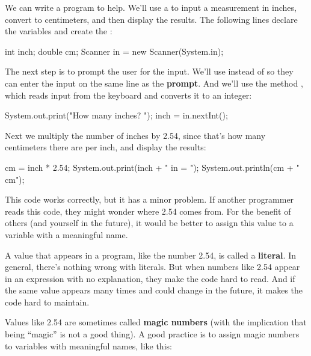 We can write a program to help.
We'll use a  to input a measurement in inches, convert to centimeters, and then display the results.
The following lines declare the variables and create the :

\begin{code}
int inch;
double cm;
Scanner in = new Scanner(System.in);
\end{code}


The next step is to prompt the user for the input.
We'll use  instead of  so they can enter the input on the same line as the {\bf prompt}.
And we'll use the  method , which reads input from the keyboard and converts it to an integer:

\begin{code}
System.out.print("How many inches? ");
inch = in.nextInt();
\end{code}

Next we multiply the number of inches by 2.54, since that's how many centimeters there are per inch, and display the results:

\begin{code}
cm = inch * 2.54;
System.out.print(inch + " in = ");
System.out.println(cm + " cm");
\end{code}

This code works correctly, but it has a minor problem.
If another programmer reads this code, they might wonder where 2.54 comes from.
For the benefit of others (and yourself in the future), it would be better to assign this value to a variable with a meaningful name.



A value that appears in a program, like the number 2.54, is called a {\bf literal}.
In general, there's nothing wrong with literals.
But when numbers like 2.54 appear in an expression with no explanation, they make the code hard to read.
And if the same value appears many times and could change in the future, it makes the code hard to maintain.


Values like 2.54 are sometimes called {\bf magic numbers} (with the implication that being ``magic'' is not a good thing).
A good practice is to assign magic numbers to variables with meaningful names, like this:

